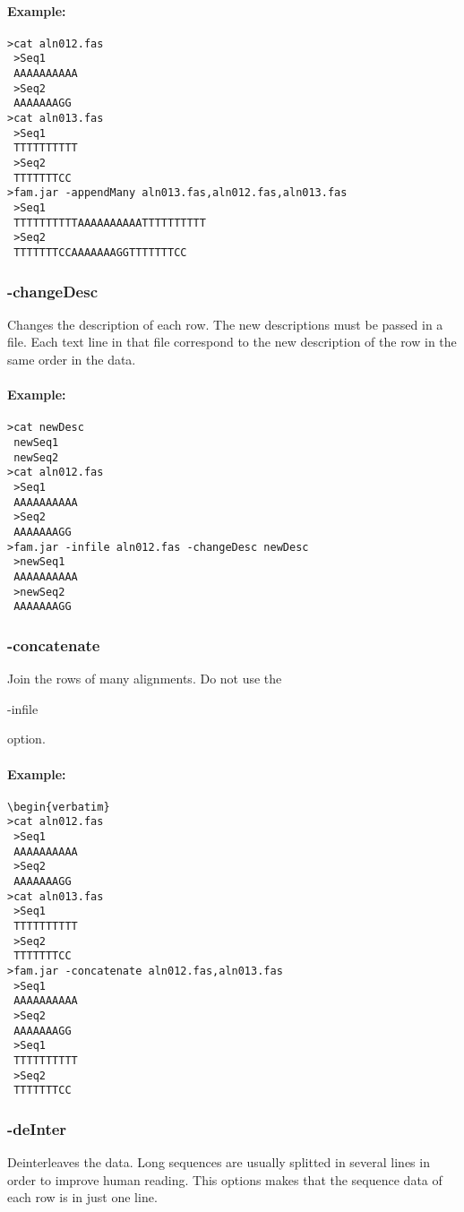 \documentclass[a4paper, twoside,10pt]{article}
\begin{document}
\paragraph{Example:}
\begin{verbatim}
>cat aln012.fas
 >Seq1
 AAAAAAAAAA
 >Seq2
 AAAAAAAGG
>cat aln013.fas
 >Seq1
 TTTTTTTTTT
 >Seq2
 TTTTTTTCC
>fam.jar -appendMany aln013.fas,aln012.fas,aln013.fas
 >Seq1
 TTTTTTTTTTAAAAAAAAAATTTTTTTTTT
 >Seq2
 TTTTTTTCCAAAAAAAGGTTTTTTTCC
\end{verbatim}

\subsubsection{-changeDesc}
Changes the description of each row. The new descriptions must be passed in a 
file. Each text line in that file correspond to the new description of the row
in the same order in the data.

\paragraph{Example:}
\begin{verbatim}
>cat newDesc
 newSeq1
 newSeq2
>cat aln012.fas
 >Seq1
 AAAAAAAAAA
 >Seq2
 AAAAAAAGG
>fam.jar -infile aln012.fas -changeDesc newDesc
 >newSeq1
 AAAAAAAAAA
 >newSeq2
 AAAAAAAGG
\end{verbatim}

\subsubsection{-concatenate}
Join the rows of many alignments. Do not use the \begin{tt}-infile\end{tt} 
option. 
\paragraph{Example:}
\begin{verbatim}
\begin{verbatim}
>cat aln012.fas
 >Seq1
 AAAAAAAAAA
 >Seq2
 AAAAAAAGG
>cat aln013.fas
 >Seq1
 TTTTTTTTTT
 >Seq2
 TTTTTTTCC
>fam.jar -concatenate aln012.fas,aln013.fas
 >Seq1
 AAAAAAAAAA
 >Seq2
 AAAAAAAGG
 >Seq1
 TTTTTTTTTT
 >Seq2
 TTTTTTTCC
\end{verbatim}

\subsubsection{-deInter}
Deinterleaves the data. Long sequences are usually splitted in several lines in
order to improve human reading. This options makes that the sequence data of 
each row is in just one line.   
\end{document}
